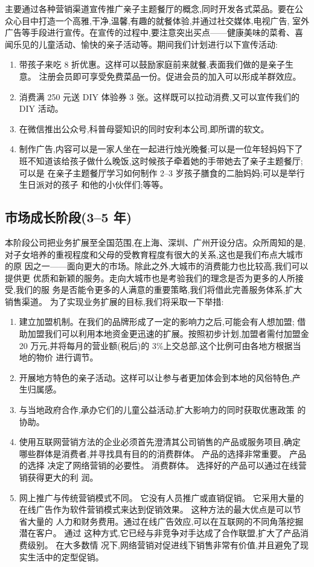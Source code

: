 主要通过各种营销渠道宣传推广亲子主题餐厅的概念,同时开发各式菜品。要在公
众心目中打造一个高雅,干净,温馨,有趣的就餐体验,并通过社交媒体,电视广告,
室外广告等手段进行宣传。在宣传的过程中,要注意突出买点——健康美味的菜肴、喜
闻乐见的儿童活动、愉快的亲子活动等。期间我们计划进行以下宣传活动:
\begin{enumerate}
\item 带孩子来吃 8 折优惠。这样可以鼓励家庭前来就餐,表面我们做的是亲子生意。
注册会员即可享受免费菜品一份。促进会员的加入可以形成羊群效应。
\item 消费满 250 元送 DIY 体验券 3 张。这样既可以拉动消费,又可以宣传我们的 DIY
活动。
\item 在微信推出公众号,科普母婴知识的同时安利本公司,即所谓的软文。
\item 制作广告,内容可以是一家人坐在一起进行烛光晚餐;可以是一位年轻妈妈下了
班不知道该给孩子做什么晚饭,这时候孩子牵着她的手带她去了亲子主题餐厅;可以是
在亲子主题餐厅学习如何制作 2--3 岁孩子膳食的二胎妈妈;可以是举行生日派对的孩子
和他的小伙伴们;等等。
\end{enumerate}

\subsection{市场成长阶段(3--5 年)}
本阶段公司把业务扩展至全国范围,在上海、深圳、广州开设分店。众所周知的是,
对子女培养的重视程度和父母的受教育程度有很大的关系,这也是我们布点大城市的原
因之一——面向更大的市场。除此之外,大城市的消费能力也比较高,我们可以提供更
优质和新颖的服务。走向大城市也是考验我们的理念是否为更多的人所接受,我们的服
务是否能令更多的人满意的重要策略,我们将借此完善服务体系,扩大销售渠道。
为了实现业务扩展的目标,我们将采取一下举措:

\begin{enumerate}[1)]
\item 建立加盟机制。在我们的品牌形成了一定的影响力之后,可能会有人想加盟;
借助加盟我们可以利用本地资金更迅速的扩展。按照初步计划,加盟者需付加盟金 20
万元,并将每月的营业额(税后)的 3\%上交总部,这个比例可由各地方根据当地的物价
进行调节。
\item 开展地方特色的亲子活动。这样可以让参与者更加体会到本地的风俗特色,产
生归属感。
\item 与当地政府合作,承办它们的儿童公益活动,扩大影响力的同时获取优惠政策
的协助。
\item 使用互联网营销方法的企业必须首先澄清其公司销售的产品或服务项目,确定
哪些群体是消费者,并寻找具有目的的消费群体。 产品的选择非常重要。 产品的选择
决定了网络营销的必要性。 消费群体。 选择好的产品可以通过在线营销获得更大的利
润。
\item 网上推广与传统营销模式不同。 它没有人员推广或直销促销。 它采用大量的
在线广告作为软件营销模式来达到促销效果。 这种方法的最大优点是可以节省大量的
人力和财务费用。通过在线广告效应,可以在互联网的不同角落挖掘潜在客户。 通过
这种方式,它已经与非竞争对手达成了合作联盟,扩大了产品消费级别。 在大多数情
况下,网络营销对促进线下销售非常有价值,并且避免了现实生活中的定型促销。
\end{enumerate}

